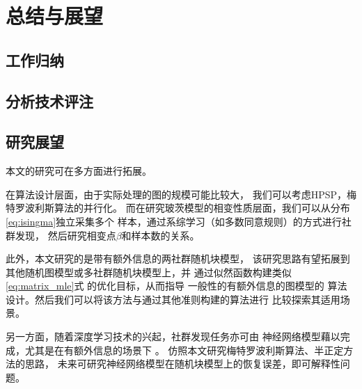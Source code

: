 \chapter{总结与展望}
\section{工作归纳}
\section{分析技术评注}
\section{研究展望}
本文的研究可在多方面进行拓展。

在算法设计层面，由于实际处理的图的规模可能比较大，
我们可以考虑HPSP，梅特罗波利斯算法的并行化。
而在研究玻茨模型的相变性质层面，我们可以从分布
\eqref{eq:isingma}独立采集多个
样本，通过系综学习（如多数同意规则）的方式进行社群发现，
然后研究相变点$\beta$和样本数的关系。

此外，本文研究的是带有额外信息的两社群随机块模型，
该研究思路有望拓展到其他随机图模型或多社群随机块模型上，并
通过似然函数构建类似\eqref{eq:matrix_mle}式
的优化目标，从而指导
一般性的有额外信息的图模型的
算法设计。然后我们可以将该方法与通过其他准则\cite{chunaev2020community}构建的算法进行
比较探索其适用场景。

另一方面，随着深度学习技术的兴起，社群发现任务亦可由
神经网络模型藉以完成，尤其是在有额外信息的场景下 \cite{cao2018incorporating}。
仿照本文研究梅特罗波利斯算法、半正定方法的思路，
未来可研究神经网络模型在随机块模型上的恢复误差，即可解释性问题。